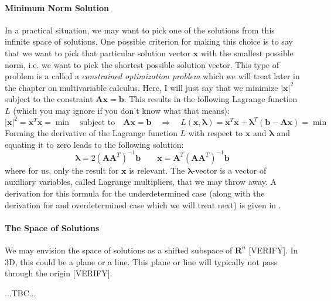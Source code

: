 \paragraph{Minimum Norm Solution}
In a practical situation, we may want to pick one of the solutions from this infinite space of solutions. One possible criterion for making this choice is to say that we want to pick that particular solution vector $\mathbf{x}$ with the smallest possible norm, i.e. we want to pick the shortest possible solution vector. This type of problem is a called a \emph{constrained optimization problem} which we will treat later in the chapter on multivariable calculus. Here, I will just say that we minimize $|\mathbf{x}|^2$ subject to the constraint $\mathbf{A x} = \mathbf{b}$. This results in the following Lagrange function $L$ (which you may ignore if you don't know what that means):
\begin{equation}
|\mathbf{x}|^2 = \mathbf{x}^T \mathbf{x} = \min 
\quad \text{subject to} \quad 
\mathbf{A x} = \mathbf{b}
\quad \Rightarrow \quad
L(\mathbf{x}, \boldsymbol{\lambda}) 
= \mathbf{x}^T \mathbf{x} + \boldsymbol{\lambda}^T (\mathbf{b} - \mathbf{A x}) = \min
\end{equation}
Forming the derivative of the Lagrange function $L$ with respect to $\mathbf{x}$ and $\boldsymbol{\lambda}$ and equating it to zero leads to the following solution:
\begin{equation}
\boldsymbol{\lambda} = 2 (\mathbf{A} \mathbf{A}^T)^{-1} \mathbf{b}
\qquad
\boxed{\mathbf{x} = \mathbf{A}^T (\mathbf{A} \mathbf{A}^T)^{-1} \mathbf{b}}
\end{equation}
where for us, only the result for $\mathbf{x}$ is relevant. The $\boldsymbol{\lambda}$-vector is a vector of auxiliary variables, called Lagrange multipliers, that we may throw away. A derivation for this formula for the underdetermined case (along with the derivation for and overdetermined case which we will treat next) is given in \cite{LinSysOverUnder}.

\paragraph{The Space of Solutions}
We may envision the space of solutions as a shifted subspace of $\mathbf{R}^n$ [VERIFY]. In 3D, this could be a plane or a line. This plane or line will typically not pass through the origin [VERIFY].

 ...TBC...


